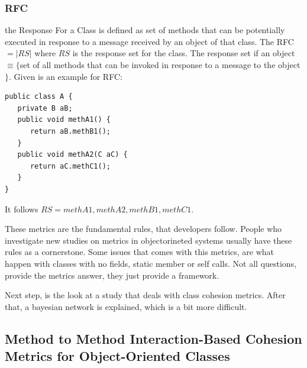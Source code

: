 \subsubsection{\textbf{RFC}} the Response For a Class is defined as set of methods that can be potentially executed in response to a message received by an object of that class. The RFC $=|RS|$ where $RS$ is the response set for the class. The response set if an object $\equiv \{$set of all methods that can be invoked in response to a message to the object$\}$. Given is an example for RFC:

\begin{small}
\begin{verbatim}
public class A {
   private B aB;
   public void methA1() {
      return aB.methB1();
   }
   public void methA2(C aC) {
      return aC.methC1();
   }
}
\end{verbatim}
\end{small}

It follows $RS = { methA1, methA2, methB1, methC1}$.

These metrics are the fundamental rules, that developers follow. People who investigate new studies on metrics in objectorineted systems usually have these rules as a cornerstone.
Some issues that comes with this metrics, are what happen with classes with no fields, static member or self calls. Not all questions, provide the metrics answer, they just provide a framework.

Next step, is the look at a study that deals with class cohesion metrics. After that, a bayesian network is explained, which is a bit more difficult.


\subsection{Method to Method Interaction-Based Cohesion Metrics for Object-Oriented Classes}\label{mmi}

